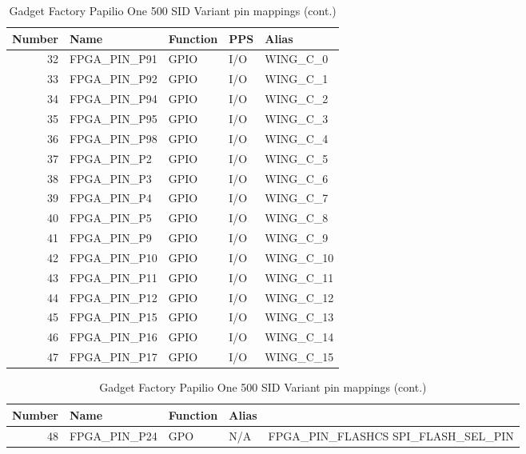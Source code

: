 \documentclass[12pt,a4paper,openany,smallheadings,headinclude,headsepline,final]{scrreprt}
\def \board {Gadget Factory Papilio One 500 SID Variant }
\begin{document}
\begin{table}[H]
\begin{center}
\begin{tabularx}{14cm}{rlllX}
Number & Name & Function & PPS & Alias \\
\hline
32 & FPGA\_PIN\_P91 & GPIO & I/O & WING\_C\_0 \\
33 & FPGA\_PIN\_P92 & GPIO & I/O & WING\_C\_1 \\
34 & FPGA\_PIN\_P94 & GPIO & I/O &  WING\_C\_2 \\
35 & FPGA\_PIN\_P95 & GPIO & I/O & WING\_C\_3 \\
36 & FPGA\_PIN\_P98 & GPIO & I/O & WING\_C\_4 \\
37 & FPGA\_PIN\_P2  & GPIO & I/O & WING\_C\_5 \\
38 & FPGA\_PIN\_P3  & GPIO & I/O & WING\_C\_6 \\
39 & FPGA\_PIN\_P4  & GPIO & I/O & WING\_C\_7 \\
40 & FPGA\_PIN\_P5  & GPIO & I/O & WING\_C\_8 \\
41 & FPGA\_PIN\_P9  & GPIO & I/O & WING\_C\_9 \\
42 & FPGA\_PIN\_P10 & GPIO & I/O & WING\_C\_10 \\
43 & FPGA\_PIN\_P11 & GPIO & I/O & WING\_C\_11 \\
44 & FPGA\_PIN\_P12 & GPIO & I/O & WING\_C\_12 \\
45 & FPGA\_PIN\_P15 & GPIO & I/O & WING\_C\_13 \\
46 & FPGA\_PIN\_P16 & GPIO & I/O & WING\_C\_14 \\
47 & FPGA\_PIN\_P17 & GPIO & I/O & WING\_C\_15 
\end{tabularx}
\caption{\board pin mappings (cont.)}
\end{center}
\end{table}


\begin{table}[H]
\begin{center}
\begin{tabularx}{14cm}{rlllX}
Number & Name & Function & Alias \\
\hline
48 & FPGA\_PIN\_P24 & GPO & N/A &  FPGA\_PIN\_FLASHCS SPI\_FLASH\_SEL\_PIN 
\end{tabularx}
\caption{\board pin mappings (cont.)}
\end{center}
\end{table}

%
%
\end{document}
